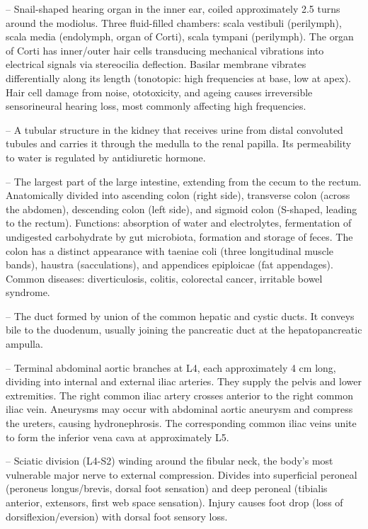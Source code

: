 -- Snail-shaped hearing organ in the inner ear, coiled approximately 2.5 turns around the modiolus. Three fluid-filled chambers: scala vestibuli (perilymph), scala media (endolymph, organ of Corti), scala tympani (perilymph). The organ of Corti has inner/outer hair cells transducing mechanical vibrations into electrical signals via stereocilia deflection. Basilar membrane vibrates differentially along its length (tonotopic: high frequencies at base, low at apex). Hair cell damage from noise, ototoxicity, and ageing causes irreversible sensorineural hearing loss, most commonly affecting high frequencies.

-- A tubular structure in the kidney that receives urine from distal convoluted tubules and carries it through the medulla to the renal papilla. Its permeability to water is regulated by antidiuretic hormone.

-- The largest part of the large intestine, extending from the cecum to the rectum. Anatomically divided into ascending colon (right side), transverse colon (across the abdomen), descending colon (left side), and sigmoid colon (S-shaped, leading to the rectum). Functions: absorption of water and electrolytes, fermentation of undigested carbohydrate by gut microbiota, formation and storage of feces. The colon has a distinct appearance with taeniae coli (three longitudinal muscle bands), haustra (sacculations), and appendices epiploicae (fat appendages). Common diseases: diverticulosis, colitis, colorectal cancer, irritable bowel syndrome.

-- The duct formed by union of the common hepatic and cystic ducts. It conveys bile to the duodenum, usually joining the pancreatic duct at the hepatopancreatic ampulla.

-- Terminal abdominal aortic branches at L4, each approximately 4 cm long, dividing into internal and external iliac arteries. They supply the pelvis and lower extremities. The right common iliac artery crosses anterior to the right common iliac vein. Aneurysms may occur with abdominal aortic aneurysm and compress the ureters, causing hydronephrosis. The corresponding common iliac veins unite to form the inferior vena cava at approximately L5.

-- Sciatic division (L4-S2) winding around the fibular neck, the body's most vulnerable major nerve to external compression. Divides into superficial peroneal (peroneus longus/brevis, dorsal foot sensation) and deep peroneal (tibialis anterior, extensors, first web space sensation). Injury causes foot drop (loss of dorsiflexion/eversion) with dorsal foot sensory loss.

